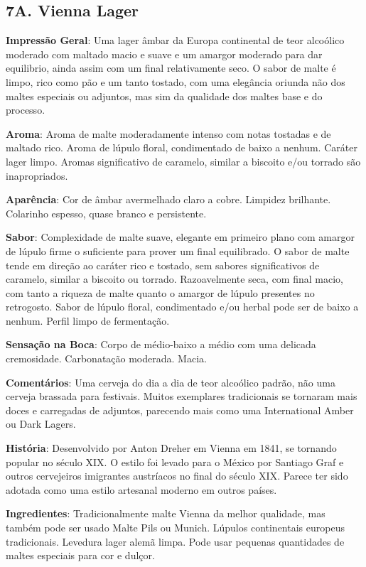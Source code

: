 \subsection*{7A. Vienna Lager}
\textbf{Impressão Geral}: Uma lager âmbar da Europa continental de teor alcoólico moderado com maltado macio e suave e um amargor moderado para dar equilibrio, ainda assim com um final relativamente seco. O sabor de malte é limpo, rico como pão e um tanto tostado, com uma elegância oriunda não dos maltes especiais ou adjuntos, mas sim da qualidade dos maltes base e do processo.

\textbf{Aroma}: Aroma de malte moderadamente intenso com notas tostadas e de maltado rico. Aroma de lúpulo floral, condimentado de baixo a nenhum. Caráter lager limpo. Aromas significativo de caramelo, similar a biscoito e/ou torrado são inapropriados.

\textbf{Aparência}: Cor de âmbar avermelhado claro a cobre. Limpidez brilhante. Colarinho espesso, quase branco e persistente.

\textbf{Sabor}: Complexidade de malte suave, elegante em primeiro plano com amargor de lúpulo firme o suficiente para prover um final equilibrado. O sabor de malte tende em direção ao caráter rico e tostado, sem sabores significativos de caramelo, similar a biscoito ou torrado. Razoavelmente seca, com final macio, com tanto a riqueza de malte quanto o amargor de lúpulo presentes no retrogosto. Sabor de lúpulo floral, condimentado e/ou herbal pode ser de baixo a nenhum. Perfil limpo de fermentação.

\textbf{Sensação na Boca}: Corpo de médio-baixo a médio com uma delicada cremosidade. Carbonatação moderada. Macia.

\textbf{Comentários}: Uma cerveja do dia a dia de teor alcoólico padrão, não uma cerveja brassada para festivais. Muitos exemplares tradicionais se tornaram mais doces e carregadas de adjuntos, parecendo mais como uma International Amber ou Dark Lagers.

\textbf{História}: Desenvolvido por Anton Dreher em Vienna em 1841, se tornando popular no século XIX. O estilo foi levado para o México por Santiago Graf e outros cervejeiros imigrantes austríacos no final do século XIX. Parece ter sido adotada como uma estilo artesanal moderno em outros países.

\textbf{Ingredientes}: Tradicionalmente malte Vienna da melhor qualidade, mas também pode ser usado Malte Pils ou Munich. Lúpulos continentais europeus tradicionais. Levedura lager alemã limpa. Pode usar pequenas quantidades de maltes especiais para cor e dulçor.

